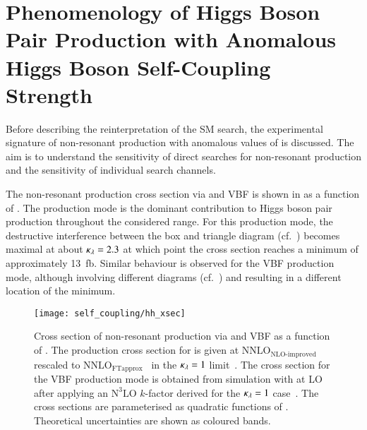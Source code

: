 \section{Phenomenology of Higgs Boson Pair Production with Anomalous
  Higgs Boson Self-Coupling Strength}%
\label{sec:self_coupling_pheno}

Before describing the reinterpretation of the SM \HH search, the experimental
signature of non-resonant \HH production with anomalous values of \klambda is
discussed. The aim is to understand the sensitivity of direct searches for
non-resonant \HH production and the sensitivity of individual search channels.

The non-resonant \HH production cross section via \ggF and VBF is shown in
 as a function of \klambda. The \ggF production mode is
the dominant contribution to Higgs boson pair production throughout the
considered \klambda range. For this production mode, the destructive
interference between the box and triangle diagram
(cf.~) becomes maximal at about $\kappa_{\lambda} = 2.3$ at
which point the cross section reaches a minimum of approximately
\SI{13}{\femto\barn}. Similar behaviour is observed for the VBF production mode,
although involving different diagrams (cf.\
) and resulting in a different
location of the minimum.

\begin{figure}[htbp]
  \centering

  \texttt{[image: self\_coupling/hh\_xsec]}

  \caption[Cross section of non-resonant \HH production via \ggF and VBF as a
  function of \klambda.]{Cross section of non-resonant \HH production via \ggF
    and VBF as a function of \klambda. The production cross section for \ggF is
    given at $\text{NNLO}_{\text{NLO-improved}}$~\cite{Borowka:2016ypz} rescaled
    to $\text{NNLO}_{\text{FTapprox}}$~\cite{Grazzini:2018bsd} in the
    $\kappa_{\lambda} = 1$ limit~\cite{Amoroso:2020lgh,Baglio:2020wgt,LHCHWGHH}. The
    cross section for the VBF production mode is obtained from simulation with
    \MGNLO at LO after applying an $\text{N}^3\text{LO}$ $k$-factor derived for
    the $\kappa_{\lambda} = 1$ case~\cite{Dreyer:2018qbw,LHCHWGHH}. The cross sections
    are parameterised as quadratic functions of \klambda. Theoretical
    uncertainties are shown as coloured bands.}%
  \label{fig:hh_xsec_incl}
\end{figure}

